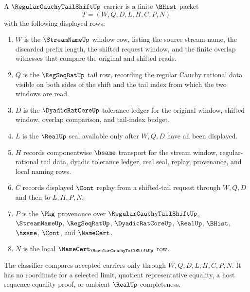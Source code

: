 \begin{definition}
\label{def:regular-cauchy-tail-shift-carrier}
A $\RegularCauchyTailShiftUp$ carrier is a finite $\BHist$ packet
$$
T=(W,Q,D,L,H,C,P,N)
$$
with the following displayed rows:
\begin{enumerate}
\item $W$ is the $\StreamNameUp$ window row, listing the source stream name, the discarded prefix length, the shifted request window, and the finite overlap witnesses that compare the original and shifted reads.
\item $Q$ is the $\RegSeqRatUp$ tail row, recording the regular Cauchy rational data visible on both sides of the shift and the tail index from which the two windows are read.
\item $D$ is the $\DyadicRatCoreUp$ tolerance ledger for the original window, shifted window, overlap comparison, and tail-index budget.
\item $L$ is the $\RealUp$ seal available only after $W,Q,D$ have all been displayed.
\item $H$ records componentwise $\hsame$ transport for the stream window, regular-rational tail data, dyadic tolerance ledger, real seal, replay, provenance, and local naming rows.
\item $C$ records displayed $\Cont$ replay from a shifted-tail request through $W,Q,D$ and then to $L,H,P,N$.
\item $P$ is the $\Pkg$ provenance over $\RegularCauchyTailShiftUp$, $\StreamNameUp$, $\RegSeqRatUp$, $\DyadicRatCoreUp$, $\RealUp$, $\BHist$, $\hsame$, $\Cont$, and $\NameCert$.
\item $N$ is the local $\NameCert_{\RegularCauchyTailShiftUp}$ row.
\end{enumerate}
The classifier compares accepted carriers only through $W,Q,D,L,H,C,P,N$. It has no coordinate for a selected limit, quotient representative equality, a host sequence equality proof, or ambient $\RealUp$ completeness.
\end{definition}

